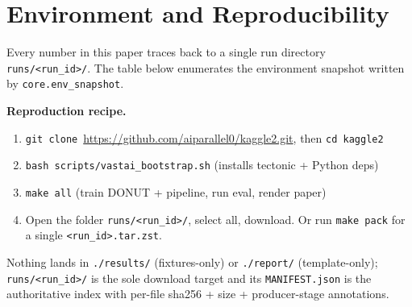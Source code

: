 \section{Environment and Reproducibility}
\label{sec:appendix_env}

Every number in this paper traces back to a single run directory
\texttt{runs/<run\_id>/}.  The table below enumerates the environment
snapshot written by \texttt{core.env\_snapshot}.

\begin{table}[t]
\centering
\caption{Environment snapshot (real values from
         \texttt{env/hostinfo.json} and \texttt{env/git\_sha.txt}).}
\label{tab:env}
\small
{}
\end{table}

\noindent\textbf{Reproduction recipe.}
{\sloppy
\begin{enumerate}
    \item \texttt{git clone}~\url{https://github.com/aiparallel0/kaggle2.git},
          then \texttt{cd kaggle2}
    \item \texttt{bash scripts/vastai\_bootstrap.sh}  (installs tectonic + Python deps)
    \item \texttt{make all}  (train DONUT + pipeline, run eval, render paper)
    \item Open the folder \texttt{runs/<run\_id>/}, select all, download.
          Or run \texttt{make pack} for a single \texttt{<run\_id>.tar.zst}.
\end{enumerate}
\par}
Nothing lands in \texttt{./results/} (fixtures-only) or \texttt{./report/}
(template-only); \texttt{runs/<run\_id>/} is the sole download target and
its \texttt{MANIFEST.json} is the authoritative index with per-file
sha256 + size + producer-stage annotations.
